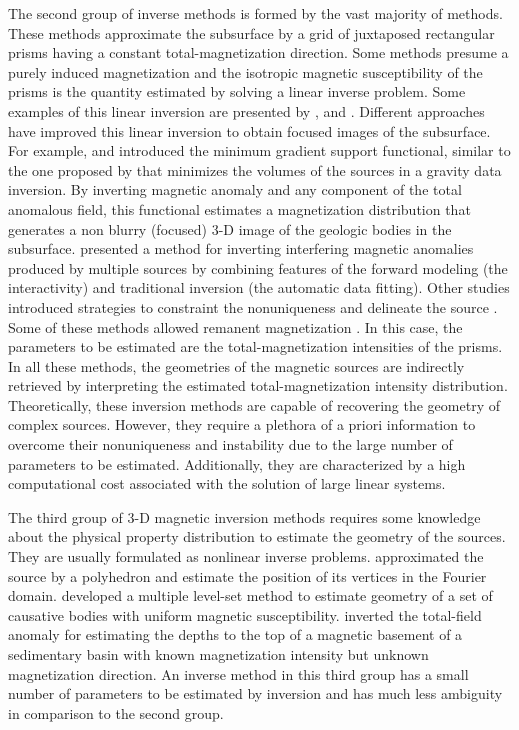 The second group of inverse methods is formed by the vast majority of methods. 
These methods approximate the subsurface by a grid of juxtaposed rectangular prisms having 
a constant total-magnetization direction. Some methods presume a purely induced 
magnetization and the isotropic magnetic susceptibility of the prisms is the quantity estimated by solving a linear inverse problem. 
Some examples of this linear inversion are presented by \cite{cribb-1976}, \cite{li_3-d_1996} and \cite{pilkington_3-d_1997}.
Different approaches have improved this linear inversion to obtain focused images of the subsurface. 
For example, \cite{portniaguine_focusing_1999} and \cite{portniaguine_3d_2002} introduced the minimum gradient support functional, similar to the one proposed by
\cite{last-1983} that minimizes the volumes of the sources in a gravity data inversion. 
By inverting magnetic anomaly and any component of the total anomalous field, this functional estimates a magnetization distribution that generates a non blurry (focused) 3-D image of the geologic bodies in the subsurface.
\cite{barbosa_interactive_2006} presented a method for inverting interfering magnetic anomalies produced by multiple sources by combining features of the forward modeling (the interactivity) and traditional inversion (the automatic data fitting). Other studies introduced strategies to constraint the nonuniqueness and delineate the source \cite[]{tontini,pilkington_3d_2009,shamsipour_3d_2011,cella_inversion_2012,abedi-2015}. 
Some of these methods allowed remanent magnetization \cite[e.g., ][]{pignatelli-2006}. 
In this case, the parameters to be estimated are the total-magnetization intensities 
of the prisms. 
In all these methods, the geometries of the magnetic sources are indirectly retrieved by interpreting the estimated total-magnetization intensity 
distribution. 
Theoretically, these inversion methods are capable of recovering the geometry of complex 
sources. However, they require a plethora of a priori information to overcome 
their nonuniqueness and instability due to the large number of parameters 
to be estimated. Additionally, they are characterized by a high 
computational cost associated with the solution of large linear systems.

The third group of 3-D magnetic inversion methods requires some knowledge about the 
physical property distribution to estimate the geometry of the sources. 
They are usually formulated as nonlinear inverse problems. 
\cite{wang_inversion_1990} approximated the source by a polyhedron and estimate 
the position of its vertices in the Fourier domain. 
\cite{wenbin-2017} developed a multiple level-set method to estimate geometry 
of a set of causative bodies with uniform magnetic susceptibility. 
\cite{hidalgo-2019} inverted the total-field anomaly for estimating the depths to the top of a magnetic basement of a sedimentary basin with known magnetization intensity but unknown magnetization direction. 
An inverse method in this third group has a small number of parameters to be estimated by inversion and has much less ambiguity in comparison to the second group. 

